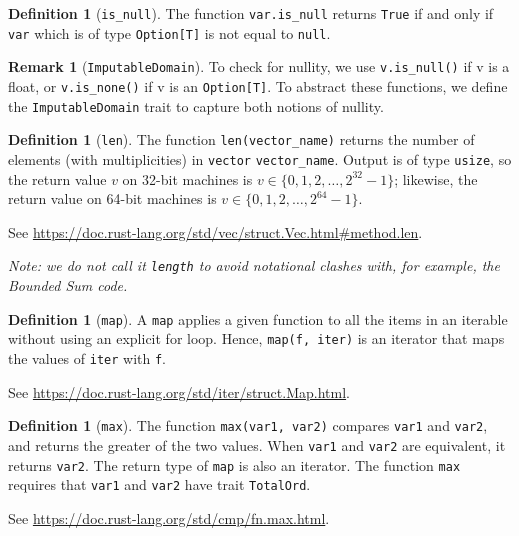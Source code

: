 \documentclass[11pt,a4paper]{article}
\theoremstyle{definition}
\newtheorem{remark}[theorem]{Remark}
\newtheorem{definition}[theorem]{Definition}
\newcommand{\inRust}[2]{See \url{#2}.}
\begin{document}
\begin{definition}[\texttt{is\_null}]
    The function \texttt{var.is\_null} returns \texttt{True} if and only if \texttt{var} which is of type \texttt{Option[T]} is not equal to \texttt{null}.
\end{definition}

\begin{remark}[\texttt{ImputableDomain}]
To check for nullity, we use \texttt{v.is\_null()} if v is a float, or \texttt{v.is\_none()} if v is an \texttt{Option[T]}. To abstract these functions, we define the \texttt{ImputableDomain} trait to capture both notions of nullity.
\end{remark}

\begin{definition}[\texttt{len}]
    The function \texttt{len(vector\_name)} returns the number of elements (with multiplicities) in \texttt{vector} \texttt{vector\_name}. Output is of type \texttt{usize}, so the return value $v$ on 32-bit machines is $v\in \{0,1,2,\ldots,2^{32} - 1\}$; likewise, the return value on 64-bit machines is $v\in \{0,1,2,\ldots,2^{64} - 1\}$. 
    
    \inRust{std::vec::Vec::len}{https://doc.rust-lang.org/std/vec/struct.Vec.html\#method.len}
\end{definition}

\emph{Note: we do not call it \texttt{length} to avoid notational clashes with, for example, the Bounded Sum code.}

\begin{definition}[\texttt{map}]
    A \texttt{map} applies a given function to all the items in an iterable without using an explicit for loop. Hence, \texttt{map(f, iter)} is an iterator that maps the values of \texttt{iter} with \texttt{f}.
    
    \inRust{Struct std::iter::Map}{https://doc.rust-lang.org/std/iter/struct.Map.html}
\end{definition}

\begin{definition}[\texttt{max}]
    The function \texttt{max(var1, var2)} compares \texttt{var1} and \texttt{var2}, and returns the greater of the two values. When \texttt{var1} and \texttt{var2} are equivalent, it returns \texttt{var2}. The return type of \texttt{map} is also an iterator. The function \texttt{max} requires that \texttt{var1} and \texttt{var2} have trait \texttt{TotalOrd}. 
    
    \inRust{std::cmp::max}{https://doc.rust-lang.org/std/cmp/fn.max.html}
\end{definition}
\end{document}
